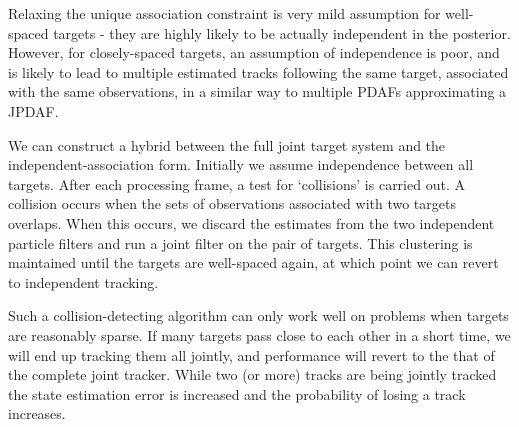 Relaxing the unique association constraint is very mild assumption for well-spaced targets - they are highly likely to be actually independent in the posterior. However, for closely-spaced targets, an assumption of independence is poor, and is likely to lead to multiple estimated tracks following the same target, associated with the same observations, in a similar way to multiple PDAFs approximating a JPDAF.

We can construct a hybrid between the full joint target system and the independent-association form. Initially we assume independence between all targets. After each processing frame, a test for `collisions' is carried out. A collision occurs when the sets of observations associated with two targets overlaps. When this occurs, we discard the estimates from the two independent particle filters and run a joint filter on the pair of targets. This clustering is maintained until the targets are well-spaced again, at which point we can revert to independent tracking.

Such a collision-detecting algorithm can only work well on problems when targets are reasonably sparse. If many targets pass close to each other in a short time, we will end up tracking them all jointly, and performance will revert to the that of the complete joint tracker. While two (or more) tracks are being jointly tracked the state estimation error is increased and the probability of losing a track increases.